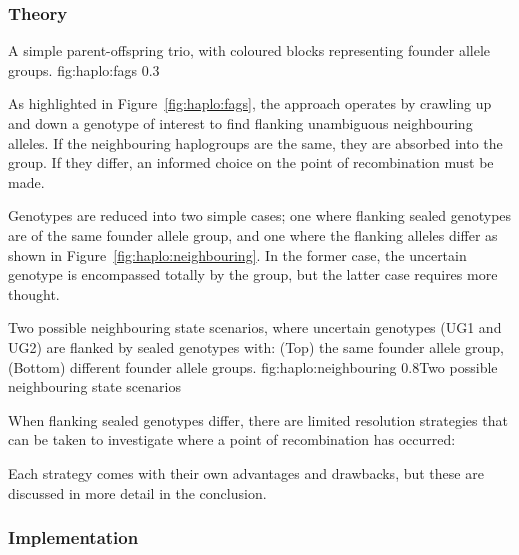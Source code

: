 \subsubsection{Theory}

	{A simple parent-offspring trio, with coloured blocks representing founder allele groups.}
	{fig:haplo:fags}
	{0.3}{}

As highlighted in Figure~\ref{fig:haplo:fags}, the approach operates by crawling up and down a genotype of interest to find flanking unambiguous neighbouring alleles. If the neighbouring haplogroups are the same, they are absorbed into the group. If they differ, an informed choice on the point of recombination must be made.

Genotypes are reduced into two simple cases; one where flanking sealed genotypes are of the same founder allele group, and one where the flanking alleles differ as shown in Figure~\ref{fig:haplo:neighbouring}. In the former case, the uncertain genotype is encompassed totally by the group, but the latter case requires more thought.

	{Two possible neighbouring state scenarios, where uncertain genotypes (UG1 and UG2) are flanked by sealed genotypes with: (Top) the same founder allele group, (Bottom) different founder allele groups.}
	{fig:haplo:neighbouring}
	{0.8}{Two possible neighbouring state scenarios}

\vspace{-20pt}
When flanking sealed genotypes differ, there are limited resolution strategies that can be taken to investigate where a point of recombination has occurred:

\begin{enumerate}

Each strategy comes with their own advantages and drawbacks, but these are discussed in more detail in the conclusion.
\end{enumerate}

\subsubsection{Implementation}

